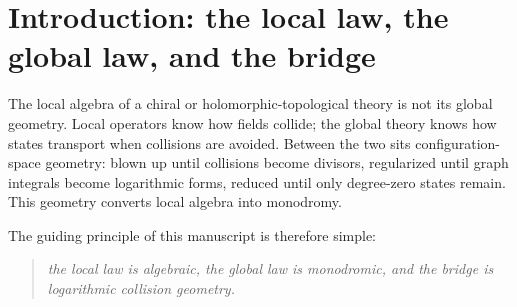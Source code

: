 \label{chap:log-ht-monodromy}%
\label{conv:five-levels-log-ht}%


\providecommand{\A}{\mathcal A}
\providecommand{\fS}{\mathfrak{S}}
\providecommand{\B}{\mathcal B}
\providecommand{\C}{\mathcal C}
\providecommand{\D}{\mathcal D}
\providecommand{\E}{\mathcal E}
\providecommand{\F}{\mathcal F}
\providecommand{\FM}{\mathrm{FM}}
\providecommand{\Conf}{\mathrm{Conf}}
\providecommand{\HT}{\mathrm{HT}}
\providecommand{\MC}{\mathrm{MC}}
\providecommand{\End}{\mathrm{End}}
\providecommand{\Hom}{\mathrm{Hom}}
\providecommand{\id}{\mathrm{id}}
\providecommand{\im}{\mathrm{im}}
\providecommand{\Res}{\mathrm{Res}}
\providecommand{\Aut}{\mathrm{Aut}}
\providecommand{\PP}{\mathbb P}
\providecommand{\AA}{\mathbb A}
\providecommand{\CC}{\mathbb C}
\providecommand{\RR}{\mathbb R}
\providecommand{\ZZ}{\mathbb Z}
\providecommand{\kk}{\Bbbk}
\providecommand{\h}{\hbar}
\providecommand{\ot}{\otimes}
\providecommand{\wot}{\widehat\otimes}
\providecommand{\s}{\mathrm s}
\providecommand{\ds}{d_{\mathrm{dR}}}
\providecommand{\CYB}{\mathrm{CYB}}
\providecommand{\PT}{\mathrm{PT}}
\providecommand{\Disk}{\mathrm{Disk}}
\providecommand{\SN}{\boldsymbol{\nabla}}
\providecommand{\bboxprod}{\mathop{\boxtimes}\displaylimits}

\section{Introduction: the local law, the global law, and the bridge}

The local algebra of a chiral or holomorphic-topological theory is not its global geometry. Local operators know how fields collide; the global theory knows how states transport when collisions are avoided. Between the two sits configuration-space geometry: blown up until collisions become divisors, regularized until graph integrals become logarithmic forms, reduced until only degree-zero states remain. This geometry converts local algebra into monodromy.

The guiding principle of this manuscript is therefore simple:
\begin{quote}
\emph{the local law is algebraic, the global law is monodromic, and the bridge is logarithmic collision geometry.}
\end{quote}

